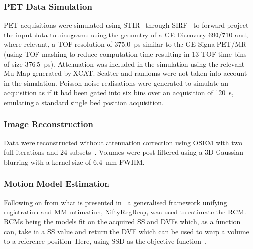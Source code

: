             \subsubsection{PET Data Simulation} \label{sec:impact_of_tof_on_respiratory_motion_model_estimation_using_pre_gated_no_intra_cycle_motion_nAC_pet_methods_pet_data_simulation}
                \gls{PET} acquisitions were simulated using \gls{STIR}~\parencite{Thielemans2012} through \gls{SIRF}~\parencite{Ovtchinnikov2017} to forward project the input data to sinograms using the geometry of a \gls{GE} Discovery 690/710 and, where relevant, a \gls{TOF} resolution of \SI{375.0}{\pico\second} similar to the \gls{GE} Signa \gls{PET}/\gls{MR} (using \gls{TOF} mashing to reduce computation time resulting in $13$ \gls{TOF} time bins of size \SI{376.5}{\pico\second}). Attenuation was included in the simulation using the relevant \gls{Mu-Map} generated by \gls{XCAT}. Scatter and randoms were not taken into account in the simulation. Poisson noise realisations were generated to simulate an acquisition as if it had been gated into six bins over an acquisition of \SI{120}{\second}, emulating a standard single bed position acquisition. 
            
            \subsubsection{Image Reconstruction} \label{sec:impact_of_tof_on_respiratory_motion_model_estimation_using_pre_gated_no_intra_cycle_motion_nAC_pet_methods_image_reconstruction}
                Data were reconstructed without attenuation correction using \gls{OSEM} with two full iterations and $24$ subsets~\parencite{Hudson1994}. Volumes were post-filtered using a \gls{3D} Gaussian blurring with a kernel size of \SI{6.4}{\milli\metre} \gls{FWHM}.
            
            \subsubsection{Motion Model Estimation} \label{sec:impact_of_tof_on_respiratory_motion_model_estimation_using_pre_gated_no_intra_cycle_motion_nAC_pet_methods_motion_model_estimation}
                Following on from what is presented in~ a generalised framework unifying registration and \gls{MM} estimation, NiftyRegResp, was used to estimate the \gls{RCM}. \glspl{RCM} being the models fit on the acquired \gls{SS} and \glspl{DVF} which, as a function can, take in a \gls{SS} value and return the \gls{DVF} which can be used to warp a volume to a reference position. Here, using \gls{SSD} as the objective function~\parencite{McClelland2017}.
                
